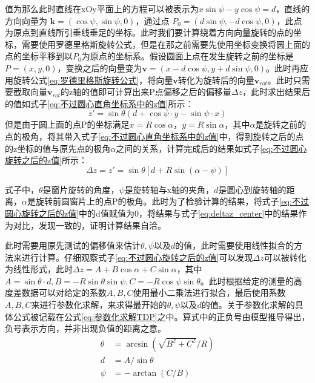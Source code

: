 \documentclass[master]{thesis-uestc}
\begin{document}
值为那么此时直线在xOy平面上的方程可以被表示为\(x \sin \psi - y \cos \psi = d\)，直线的方向向量为 \(\mathbf{k} = (\cos \psi, \sin \psi, 0)\)，通过点 \(P_0 = (d \sin\psi, -d\cos\psi , 0)\)，此点为原点到直线所引垂线垂足的坐标。此时我们要计算绕着方向向量旋转的点的坐标，需要使用罗德里格斯旋转公式，但是在那之前需要先使用坐标变换将圆上面的点的坐标平移到以\(P_0\)为原点的坐标系。假设圆面上点在发生旋转之前的坐标是\(P = (x,y,0)\)，变换之后的向量变为\(\mathbf{v} = (x - d\cos\psi, y + d\sin\psi, 0)\)。此时再应用旋转公式\ref{eq:罗德里格斯旋转公式}，将向量\(\mathbf{v}\)转化为旋转后的向量\(\mathbf{v}_{rot}\)。此时只需要截取向量\(\mathbf{v}_{rot}\)的z轴的值即可计算出来P点偏移之后的偏移量\(\Delta z\)，此时求出结果后的值如式子\ref{eq:不过圆心直角坐标系中的z值}所示：
\begin{equation}\label{eq:不过圆心直角坐标系中的z值}
    z' = \sin \theta \left(d + \cos\psi \cdot y - \sin\psi \cdot x \right)
\end{equation}
但是由于圆上面的点P的坐标满足\(x = R\cos\alpha\)，\(y = R\sin\alpha\)，其中\(\alpha\)是旋转之前的点的极角，将其带入式子\ref{eq:不过圆心直角坐标系中的z值}中，得到旋转之后的点的z坐标的值与原先点的极角\(\alpha\)之间的关系，计算完成后的结果如式子\ref{eq:不过圆心旋转之后的z值}所示：
\begin{equation}\label{eq:不过圆心旋转之后的z值}
    \Delta z = z' = \sin \theta \left[d+R \sin (\alpha -\psi )\right]
\end{equation}

式子中，\(\theta\)是窗片旋转的角度，\(\psi\)是旋转轴与x轴的夹角，\(d\)是圆心到旋转轴的距离，\(\alpha\)是旋转前圆窗片上的点P的极角。此时为了检验计算的结果，将式子\ref{eq:不过圆心旋转之后的z值}中的d值赋值为0，将结果与式子\ref{eq:deltaz_center}中的结果作为对比，发现一致的，证明计算结果自洽。

此时需要用原先测试的偏移值来估计\(\theta, \psi\)以及\(d\)的值，此时需要使用线性拟合的方法来进行计算。仔细观察式子\ref{eq:不过圆心旋转之后的z值}可以发现\(\Delta z\)可以被转化为线性形式，此时\(\Delta z =A+B \cos \alpha +C \sin \alpha \)，其中\(A = \sin \theta \cdot d, B = -R \sin \theta \sin \psi, C = -R \cos \psi \sin \theta \)。此时根据给定的测量的高度差数据可以对给定的系数\(A, B, C\)使用最小二乘法进行拟合，最后使用系数\(A, B, C\)来进行参数化求解，来求得最开始的\(\theta, \psi\)以及\(d\)的值。关于参数化求解的具体公式被记载在公式\ref{eq:参数化求解TDP}之中。算式中的正负号由模型推导得出，负号表示方向，并非出现负值的距离之意。
\begin{subequations}\label{eq:参数化求解TDP}
    \begin{align}
        \theta &= \arcsin(\sqrt{B^2 + C^2}/R)  \label{eq:sin_theta}\\
        d &= A / \sin\theta  \\
        \psi &= - \arctan(C/B) 
    \end{align}
\end{subequations}
\end{document}
